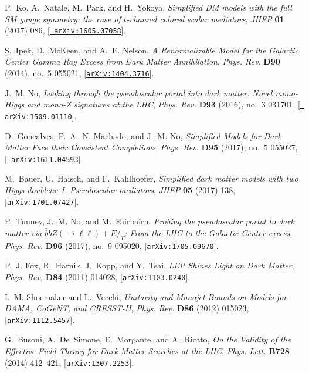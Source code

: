 \documentclass[a4paper, 11pt,notoc]{article}
\begin{document}
\begin{thebibliography}{100}
P.~Ko, A.~Natale, M.~Park, and H.~Yokoya, {\it {Simplified DM models with the
  full SM gauge symmetry: the case of $t$-channel colored scalar mediators}},
  {\em JHEP} {\bf 01} (2017) 086, [\href{http://arxiv.org/abs/1605.07058}{{\tt
  arXiv:1605.07058}}].

S.~Ipek, D.~McKeen, and A.~E. Nelson, {\it {A Renormalizable Model for the
  Galactic Center Gamma Ray Excess from Dark Matter Annihilation}},  {\em Phys.
  Rev.} {\bf D90} (2014), no.~5 055021,
  [\href{http://arxiv.org/abs/1404.3716}{{\tt arXiv:1404.3716}}].

J.~M. No, {\it {Looking through the pseudoscalar portal into dark matter: Novel
  mono-Higgs and mono-Z signatures at the LHC}},  {\em Phys. Rev.} {\bf D93}
  (2016), no.~3 031701, [\href{http://arxiv.org/abs/1509.01110}{{\tt
  arXiv:1509.01110}}].

D.~Goncalves, P.~A.~N. Machado, and J.~M. No, {\it {Simplified Models for Dark
  Matter Face their Consistent Completions}},  {\em Phys. Rev.} {\bf D95}
  (2017), no.~5 055027, [\href{http://arxiv.org/abs/1611.04593}{{\tt
  arXiv:1611.04593}}].

M.~Bauer, U.~Haisch, and F.~Kahlhoefer, {\it {Simplified dark matter models
  with two Higgs doublets: I. Pseudoscalar mediators}},  {\em JHEP} {\bf 05}
  (2017) 138, [\href{http://arxiv.org/abs/1701.07427}{{\tt arXiv:1701.07427}}].

P.~Tunney, J.~M. No, and M.~Fairbairn, {\it {Probing the pseudoscalar portal to
  dark matter via $\bar bbZ(\to\ell\ell)+ E\!\!\!/_T$: From the LHC to the
  Galactic Center excess}},  {\em Phys. Rev.} {\bf D96} (2017), no.~9 095020,
  [\href{http://arxiv.org/abs/1705.09670}{{\tt arXiv:1705.09670}}].

P.~J. Fox, R.~Harnik, J.~Kopp, and Y.~Tsai, {\it {LEP Shines Light on Dark
  Matter}},  {\em Phys. Rev.}  {\bf D84} (2011) 014028,
  [\href{http://arxiv.org/abs/1103.0240}{{\tt arXiv:1103.0240}}].

I.~M. Shoemaker and L.~Vecchi, {\it {Unitarity and Monojet Bounds on Models for
  DAMA, CoGeNT, and CRESST-II}},  {\em Phys. Rev.} {\bf D86} (2012) 015023,
  [\href{http://arxiv.org/abs/1112.5457}{{\tt arXiv:1112.5457}}].

G.~Busoni, A.~De~Simone, E.~Morgante, and A.~Riotto, {\it {On the Validity of
  the Effective Field Theory for Dark Matter Searches at the LHC}},  {\em Phys.
  Lett.} {\bf B728} (2014) 412--421,
  [\href{http://arxiv.org/abs/1307.2253}{{\tt arXiv:1307.2253}}].


\end{thebibliography}
\end{document}
